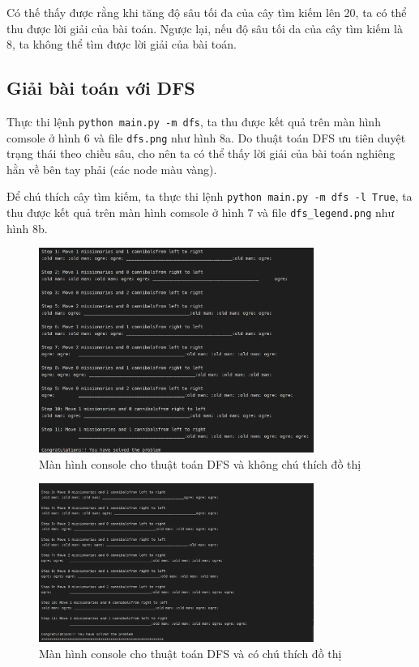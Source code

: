\documentclass[a4paper, 11pt]{article}
\begin{document}
Có thế thấy được rằng khi tăng độ sâu tối đa của cây tìm kiếm lên 20, ta có thể thu được lời giải của bài toán. Ngược lại, nếu độ sâu tối da của cây tìm kiếm là 8, ta không thể tìm được lời giải của bài toán.

\subsection{Giải bài toán với DFS}

Thực thi lệnh \lstinline|python main.py -m dfs|, ta thu được kết quả trên màn hình comsole ở hình 6 và file \lstinline|dfs.png| như hình 8a. Do thuật toán DFS ưu tiên duyệt trạng thái theo chiều sâu, cho nên ta có thể thấy lời giải của bài toán nghiêng hằn về bên tay phải (các node màu vàng).

Để chú thích cây tìm kiếm, ta thực thi lệnh \lstinline|python main.py -m dfs -l True|, ta thu được kết quả trên màn hình comsole ở hình 7 và file \lstinline|dfs_legend.png| như hình 8b.

\begin{figure}[H]
    \centering
    \includegraphics[width=0.8\textwidth,height=0.8\textheight,keepaspectratio]{dfs_console.png}
    \caption{Màn hình console cho thuật toán DFS và không chú thích đồ thị}
\end{figure}

\begin{figure}[H]
    \centering
    \includegraphics[width=0.8\textwidth,height=0.8\textheight,keepaspectratio]{dfs_console_legend.png}
    \caption{Màn hình console cho thuật toán DFS và có chú thích đồ thị}
\end{figure}
\end{document}
